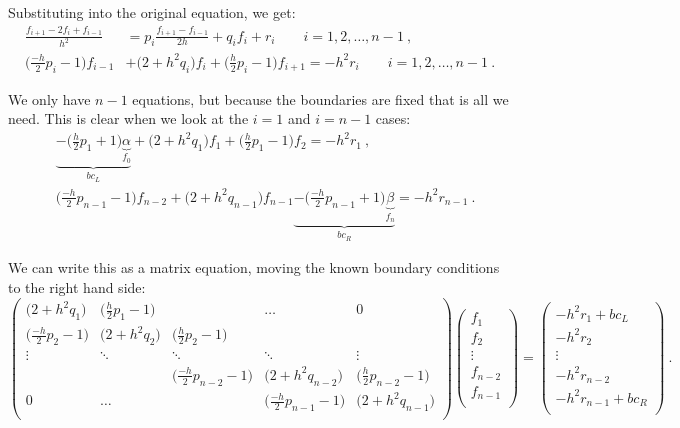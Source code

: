 \documentclass[12pt]{article}
\begin{document}
Substituting into the original equation, we get:
\begin{align}
\frac{f_{i+1} - 2f_i + f_{i-1}}{h^2} &= p_i \frac{f_{i+1} - f_{i-1}}{2h} + q_i f_i + r_i \qquad i = 1, 2, \dots, n-1 \:,\nonumber \\
%
\bigl(\frac{-h}{2}p_i - 1\bigr) f_{i-1} &+ \bigl(2 + h^2q_i\bigr)f_i + \bigl(\frac{h}{2}p_i - 1\bigr) f_{i+1} = -h^2 r_i \qquad i = 1, 2, \dots, n-1 \:.\nonumber
\end{align}

We only have $n-1$ equations, but because the boundaries are fixed that is all we need. This is clear when we look at the $i=1$ and $i=n-1$ cases:
\begin{align}
&\underbrace{-\bigl(\frac{h}{2}p_1 + 1\bigr) \underbrace{\alpha}_{f_0}}_{bc_L} + \bigl(2 + h^2q_1\bigr)f_1 + \bigl(\frac{h}{2}p_1 - 1\bigr) f_{2} = -h^2 r_1  \:,\nonumber \\
&\bigl(\frac{-h}{2}p_{n-1} - 1\bigr) f_{n-2} + \bigl(2 + h^2q_{n-1}\bigr)f_{n-1}  \underbrace{-\bigl(\frac{-h}{2}p_{n-1} + 1\bigr) \underbrace{\beta}_{f_n}}_{bc_R}= -h^2 r_{n-1} \:.\nonumber
\end{align}

We can write this as a matrix equation, moving the known boundary conditions to the right hand side:
\begin{equation}
\begin{pmatrix}
\bigl(2 + h^2q_1\bigr) & \bigl(\frac{h}{2}p_1 - 1\bigr) & & \hdots & 0 \\
%
\bigl(\frac{-h}{2}p_2 - 1\bigr) & \bigl(2 + h^2q_2\bigr) & \bigl(\frac{h}{2}p_2 - 1\bigr) & &  \\
\vdots & \ddots & \ddots & \ddots & \vdots \\
& & \bigl(\frac{-h}{2}p_{n-2} - 1\bigr) & \bigl(2 + h^2q_{n-2}\bigr)  & \bigl(\frac{h}{2}p_{n-2} - 1\bigr) \\
0 & \hdots & & \bigl(\frac{-h}{2}p_{n-1} - 1\bigr) & \bigl(2 + h^2q_{n-1}\bigr) \\
\end{pmatrix}
%
\begin{pmatrix}
f_1 \\ f_2 \\ \vdots \\ f_{n-2} \\ f_{n-1} \\
\end{pmatrix}
= 
\begin{pmatrix}
-h^2 r_1 + bc_L \\ -h^2 r_2 \\ \vdots \\ -h^2 r_{n-2} \\ -h^2 r_{n-1} + bc_R\\ 
\end{pmatrix}\:.\nonumber
\end{equation}
\end{document}
